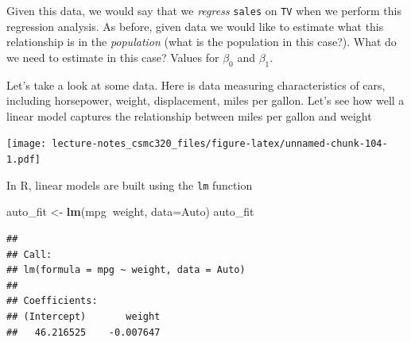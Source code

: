 \documentclass[12pt,]{book}
\newenvironment{Shaded}{\begin{snugshade}}{\end{snugshade}}
\newcommand{\KeywordTok}[1]{\textcolor[rgb]{0.13,0.29,0.53}{\textbf{#1}}}
\newcommand{\DataTypeTok}[1]{\textcolor[rgb]{0.13,0.29,0.53}{#1}}
\newcommand{\StringTok}[1]{\textcolor[rgb]{0.31,0.60,0.02}{#1}}
\newcommand{\OperatorTok}[1]{\textcolor[rgb]{0.81,0.36,0.00}{\textbf{#1}}}
\newcommand{\NormalTok}[1]{#1}
\theoremstyle{definition}
\theoremstyle{definition}
\theoremstyle{definition}
\theoremstyle{remark}
\begin{document}
Given this data, we would say that we \emph{regress} \texttt{sales} on
\texttt{TV} when we perform this regression analysis. As before, given
data we would like to estimate what this relationship is in the
\emph{population} (what is the population in this case?). What do we
need to estimate in this case? Values for \(\beta_0\) and \(\beta_1\).

Let's take a look at some data. Here is data measuring characteristics
of cars, including horsepower, weight, displacement, miles per gallon.
Let's see how well a linear model captures the relationship between
miles per gallon and weight

\begin{Shaded}
\end{Shaded}

\texttt{[image: lecture-notes\_csmc320\_files/figure-latex/unnamed-chunk-104-1.pdf]}

In R, linear models are built using the \texttt{lm} function

\begin{Shaded}
\begin{Highlighting}[]
\NormalTok{auto_fit <-}\StringTok{ }\KeywordTok{lm}\NormalTok{(mpg}\OperatorTok{~}\NormalTok{weight, }\DataTypeTok{data=}\NormalTok{Auto)}
\NormalTok{auto_fit}
\end{Highlighting}
\end{Shaded}

\begin{verbatim}
## 
## Call:
## lm(formula = mpg ~ weight, data = Auto)
## 
## Coefficients:
## (Intercept)       weight  
##   46.216525    -0.007647
\end{verbatim}
\end{document}
